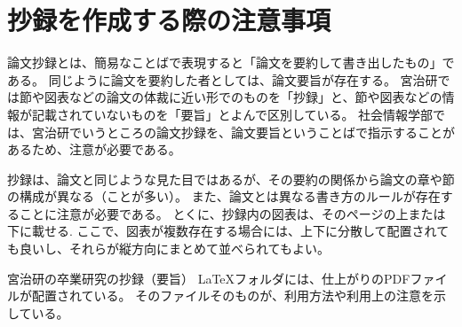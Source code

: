 \documentclass[a4paper,10pt,twocolumn]{jsarticle}
\begin{document}
\section{抄録を作成する際の注意事項}
論文抄録とは、簡易なことばで表現すると「論文を要約して書き出したもの」である。
同じように論文を要約した者としては、論文要旨が存在する。
宮治研では節や図表などの論文の体裁に近い形でのものを「抄録」と、節や図表などの情報が記載されていないものを「要旨」とよんで区別している。
社会情報学部では、宮治研でいうところの論文抄録を、論文要旨ということばで指示することがあるため、注意が必要である。

抄録は、論文と同じような見た目ではあるが、その要約の関係から論文の章や節の構成が異なる（ことが多い）。
また、論文とは異なる書き方のルールが存在することに注意が必要である。
とくに、抄録内の図表は、そのページの上または下に載せる.
ここで、図表が複数存在する場合には、上下に分散して配置されても良いし、それらが縦方向にまとめて並べられてもよい。

宮治研の卒業研究の抄録（要旨） \LaTeX フォルダには、仕上がりのPDFファイルが配置されている。
そのファイルそのものが、利用方法や利用上の注意を示している。

%
\end{document}

